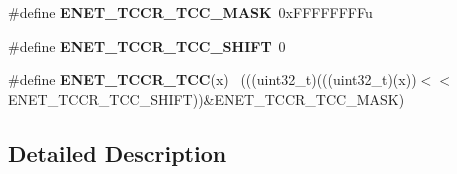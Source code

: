 \begin{DoxyCompactItemize}
\item 
\hypertarget{group___e_n_e_t___register___masks_ga6f9999013e2cb91eaf8ebbdc67ca9fe8}{}\#define {\bfseries E\+N\+E\+T\+\_\+\+T\+C\+C\+R\+\_\+\+T\+C\+C\+\_\+\+M\+A\+S\+K}~0x\+F\+F\+F\+F\+F\+F\+F\+Fu\label{group___e_n_e_t___register___masks_ga6f9999013e2cb91eaf8ebbdc67ca9fe8}

\item 
\hypertarget{group___e_n_e_t___register___masks_ga72e171b218136489e1e0b5dcb7aefab7}{}\#define {\bfseries E\+N\+E\+T\+\_\+\+T\+C\+C\+R\+\_\+\+T\+C\+C\+\_\+\+S\+H\+I\+F\+T}~0\label{group___e_n_e_t___register___masks_ga72e171b218136489e1e0b5dcb7aefab7}

\item 
\hypertarget{group___e_n_e_t___register___masks_gaf399783e7c5b555d83efa57ef38f81e0}{}\#define {\bfseries E\+N\+E\+T\+\_\+\+T\+C\+C\+R\+\_\+\+T\+C\+C}(x)                                              ~(((uint32\+\_\+t)(((uint32\+\_\+t)(x))$<$$<$E\+N\+E\+T\+\_\+\+T\+C\+C\+R\+\_\+\+T\+C\+C\+\_\+\+S\+H\+I\+F\+T))\&E\+N\+E\+T\+\_\+\+T\+C\+C\+R\+\_\+\+T\+C\+C\+\_\+\+M\+A\+S\+K)\label{group___e_n_e_t___register___masks_gaf399783e7c5b555d83efa57ef38f81e0}

\end{DoxyCompactItemize}


\subsection{Detailed Description}
